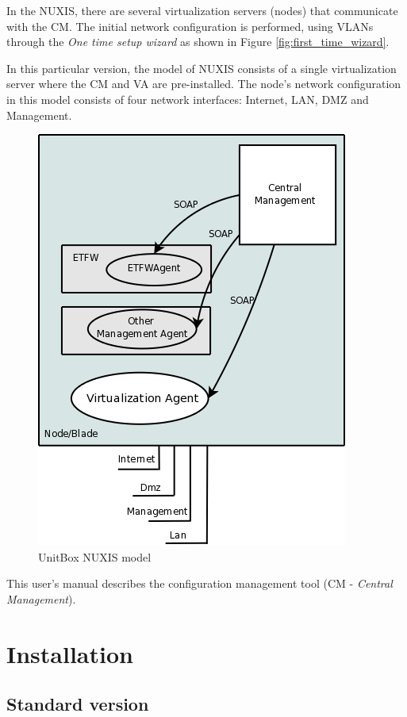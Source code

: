 In the NUXIS, there are several virtualization servers (nodes) that communicate with the CM. The initial network configuration is performed, using VLANs through the \emph{One time setup wizard} as shown in Figure \ref{fig:first_time_wizard}.

In this particular version, the model of NUXIS consists of a single virtualization server where the CM and VA are pre-installed. The node's network configuration in this model consists of four network interfaces: Internet, LAN, DMZ and Management.

\begin{figure}[H]
    \begin{center}
	\includegraphics[scale=0.4]{screenshots/etva_standard.png}
	\caption{UnitBox NUXIS model}
	\label{fig:etva_standard}
	\end{center}
\end{figure}

This user's manual describes the configuration management tool (CM - \emph{Central Management}). 

\pagebreak
\chapter{\textsf{Installation}}
\label{chp:installation}
\section{Standard version}

